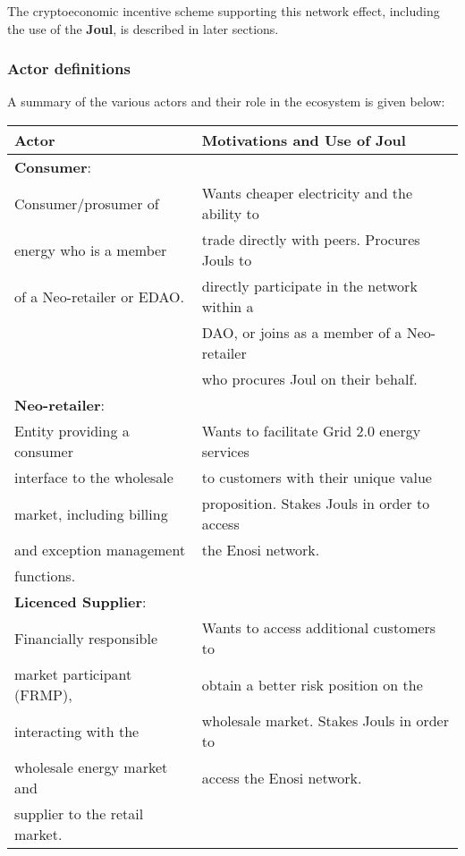 \documentclass{article}
\newcommand{\head}[1]{\textnormal{\textbf{#1}}}
\theoremstyle{definition}
\theoremstyle{plain} %
\begin{document}
\noindent The cryptoeconomic incentive scheme supporting this network effect, including the use of the \textbf{Joul}, is described in later sections.

\subsubsection{Actor definitions}

A summary of the various actors and their role in the ecosystem is given below:\\


\begin{tabular}{|l|l|}
 \hline 	
 \head{Actor} & \head{Motivations and Use of Joul}\\
 \hline 
 \hline
 
 \textbf{Consumer}:				& \\
 \hline 
 Consumer/prosumer of 	 		& Wants cheaper electricity and the ability to	\\
 energy who is a member  		& trade directly with peers. Procures Jouls to	\\
 of a Neo-retailer or EDAO.		& directly participate in the network within a	\\
  								& DAO, or joins as a member of a Neo-retailer	\\
 								& who procures Joul on their behalf. 			\\
 \hline

 \textbf{Neo-retailer}:			& \\
 \hline
 Entity providing a consumer	& Wants to facilitate Grid 2.0 energy services	\\
 interface to the wholesale 	& to customers with their unique value 			\\
 market, including billing 		& proposition. Stakes Jouls in order to access 	\\
 and exception management 		& the Enosi network.							\\
 functions. 					& \\ 
 \hline 
 
 \textbf{Licenced Supplier}:	& \\ 
 \hline
 Financially responsible 		& Wants to access additional customers to 		\\
 market participant (FRMP), 	& obtain a better risk position on the			\\
 interacting with the 			& wholesale market. Stakes Jouls in order to 	\\
 wholesale energy market and 	& access the Enosi network.						\\
 supplier to the retail market.	& \\
 \hline 
 

\end{tabular}
\end{document}
